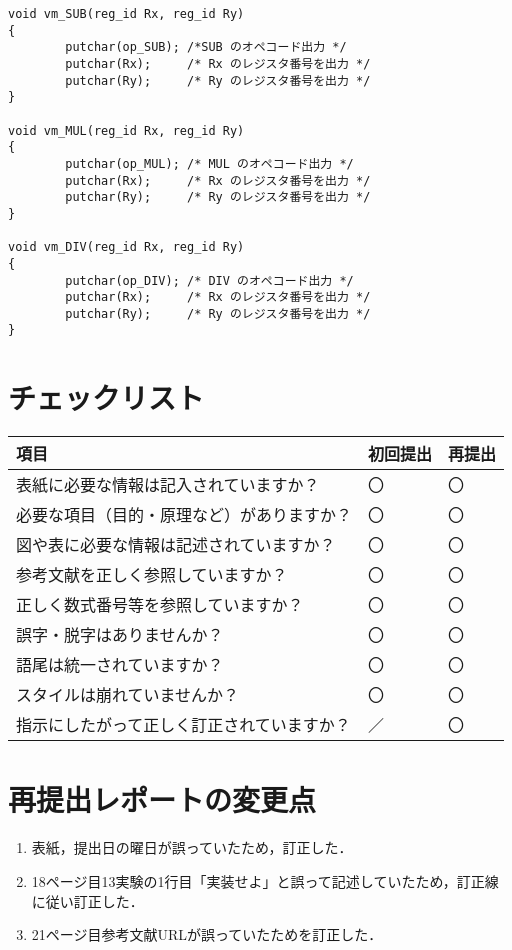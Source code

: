 \documentclass[a4j]{jsarticle}  %
\begin{document}
\begin{verbatim}
void vm_SUB(reg_id Rx, reg_id Ry)
{
        putchar(op_SUB); /*SUB のオペコード出力 */
        putchar(Rx);     /* Rx のレジスタ番号を出力 */
        putchar(Ry);     /* Ry のレジスタ番号を出力 */
}

void vm_MUL(reg_id Rx, reg_id Ry)
{
        putchar(op_MUL); /* MUL のオペコード出力 */
        putchar(Rx);     /* Rx のレジスタ番号を出力 */
        putchar(Ry);     /* Ry のレジスタ番号を出力 */
}

void vm_DIV(reg_id Rx, reg_id Ry)
{
        putchar(op_DIV); /* DIV のオペコード出力 */
        putchar(Rx);     /* Rx のレジスタ番号を出力 */
        putchar(Ry);     /* Ry のレジスタ番号を出力 */
}
\end{verbatim}


\newpage

\section*{チェックリスト}

\begin{tabular}{|l|l|l|} \hline
 項目                                       & 初回提出 & 再提出 \\ \hline
 表紙に必要な情報は記入されていますか？     & 〇       & 〇     \\ \hline
 必要な項目（目的・原理など）がありますか？ & 〇       & 〇     \\ \hline
 図や表に必要な情報は記述されていますか？   & 〇       & 〇     \\ \hline
 参考文献を正しく参照していますか？         & 〇       & 〇     \\ \hline
 正しく数式番号等を参照していますか？       & 〇       & 〇     \\ \hline
 誤字・脱字はありませんか？                 & 〇       & 〇     \\ \hline
 語尾は統一されていますか？                 & 〇       & 〇     \\ \hline
 スタイルは崩れていませんか？               & 〇       & 〇     \\ \hline
 指示にしたがって正しく訂正されていますか？ & ／       & 〇     \\ \hline
\end{tabular} 

\newpage

\section*{再提出レポートの変更点}
\begin{enumerate}
 \item 表紙，提出日の曜日が誤っていたため，訂正した．
\item 18ページ目13実験の1行目「実装せよ」と誤って記述していたため，訂正線に従い訂正した．
 \item 21ページ目参考文献URLが誤っていたためを訂正した．
\end{enumerate}
\end{document}
